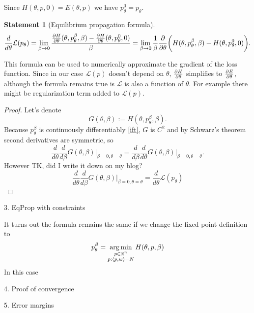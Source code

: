 \documentclass[a4paper,10pt]{report}
\newtheorem{statement}{Statement}
\begin{document}
Since $H(\theta,p,0) = E(\theta,p)$ we have $p_{\theta}^{0}=p_{\theta}$.

\begin{statement}[Equilibrium propagation formula]
 \begin{equation}
 \frac{d}{d\theta} \mathcal{L}(p_\theta) = \lim_{\beta \to 0} \frac{\frac{\partial H}{\partial \theta}(\theta, p_\theta^\beta, \beta)-\frac{\partial H}{\partial \theta}(\theta, p_\theta^0, 0) }{\beta} = \lim_{\beta \to 0}\frac{1}{\beta} \frac{\partial }{\partial \theta} \bigg(H(\theta, p_\theta^\beta,\beta) - H(\theta, p_\theta^0, 0)\bigg).
\end{equation}
\end{statement}
This formula can be used to numerically approximate the gradient of the loss function.
Since in our case $\mathcal{L}(p)$ doesn't depend on $\theta$, $\frac{\partial H}{\partial \theta}$ simplifies to $\frac{\partial E}{\partial \theta}$, although the formula remains true is $\mathcal{L}$ is also a function of $\theta$. For example there might be regularization term added to $\mathcal{L}(p)$.

\begin{proof} Let's denote
 \begin{equation}
 G(\theta, \beta) := H(\theta, p_\theta^\beta, \beta).
\end{equation}
Because $p_\theta^\beta$ is continuously differentiably \ref{ift}, $G$ is $C^2$ and by Schwarz's theorem second derivatives are symmetric, so
\begin{equation}
 \frac{d}{d\theta}\frac{d}{d\beta}G(\theta,\beta)\big|_{\beta=0, \theta = \theta} =\frac{d}{d\beta}\frac{d}{d\theta}G(\theta,\beta)\big|_{\beta=0, \theta = \theta}.
\end{equation}
However
TK, did I write it down on my blog?
\begin{equation}
 \frac{d}{d\theta}\frac{d}{d\beta}G(\theta,\beta)\big|_{\beta=0, \theta = \theta} = \frac{d}{d\theta} \mathcal{L}(p_\theta)
\end{equation}
\end{proof}

3. EqProp with constraints


It turns out the formula remains the same if we change the fixed point definition to
\begin{equation}
 p_\theta^\beta = \operatorname*{arg\,min}_{\substack{p \in \mathbb{R}^n \\ p: \langle p, w \rangle=N }} H(\theta, p, \beta)
\end{equation}
In this case

4. Proof of convergence

5. Error margins
\end{document}
